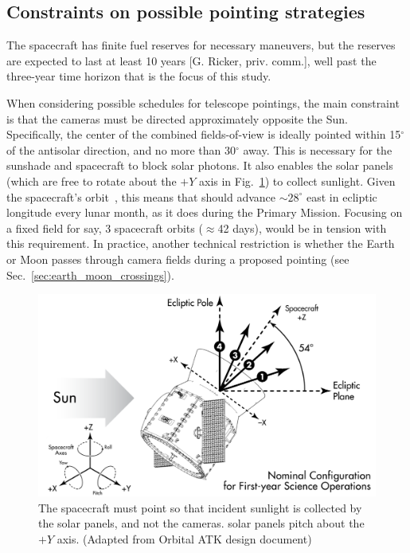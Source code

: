 \subsection{Constraints on possible pointing strategies}
\label{sec:constraints_on_pointings}

The spacecraft has finite fuel reserves for necessary maneuvers, but
the reserves are expected to last at least 10 years [G. Ricker,
  priv. comm.], well past the three-year time horizon that is the
focus of this study.

When considering possible schedules for telescope pointings, the main
constraint is that the cameras must be directed approximately opposite
the Sun.  Specifically, the center of the combined fields-of-view is
ideally pointed within 15$^\circ$ of the antisolar direction, and no
more than 30$^\circ$ away.
This is necessary for the sunshade and spacecraft to block solar
photons.  It also enables the solar panels (which are free to rotate
about the $+Y$ axis in Fig.~\ref{fig:spacecraft_angles}) to collect
sunlight.  Given the spacecraft's orbit~\citep{gangestad_high_2013},
this means that \tess should advance $\sim28^\circ$ east in ecliptic
longitude every lunar month, as it does during the Primary Mission.
Focusing on a fixed field for say, 3 spacecraft orbits ($\approx$42
days), would be in tension with this requirement.  In practice,
another technical restriction is whether the Earth or Moon passes
through \tesss camera fields during a proposed pointing (see
Sec.~\ref{sec:earth_moon_crossings}).

\begin{figure}[!b]
	\centering
	\includegraphics{figures/spacecraft_angles.pdf}
	\caption{The spacecraft must point so that incident sunlight is collected 
		by the solar panels, and not the cameras. \tesss solar panels pitch 
		about the $+Y$ axis. (Adapted from Orbital ATK design document) }
	\label{fig:spacecraft_angles}
\end{figure}

